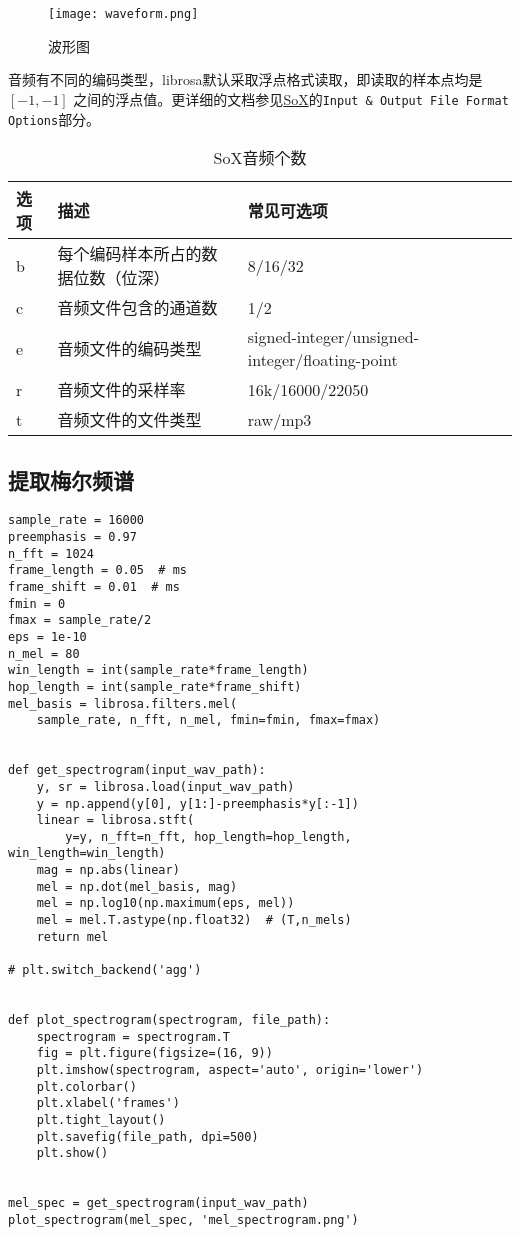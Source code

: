 \documentclass[cn,10pt,math=newtx,citestyle=gb7714-2015,bibstyle=gb7714-2015]{elegantbook}
\begin{document}
\begin{figure}[htbp]
  \centering
  \texttt{[image: waveform.png]}
  \caption{波形图 \label{fig:waveform}}
\end{figure}


音频有不同的编码类型，librosa默认采取浮点格式读取，即读取的样本点均是 $[-1,-1]$ 之间的浮点值。更详细的文档参见\href{http://sox.sourceforge.net/sox.html}{SoX}的\lstinline{Input & Output File Format Options}部分。

\begin{table}[htbp]
  \centering
  \caption{SoX音频个数}
    \begin{tabular}{llll}
    \toprule
    选项 & 描述 & 常见可选项 \\
    \midrule
    b & 每个编码样本所占的数据位数（位深） & 8/16/32 \\
    c & 音频文件包含的通道数 & 1/2 \\
    e & 音频文件的编码类型 & signed-integer/unsigned-integer/floating-point \\
    r & 音频文件的采样率 & 16k/16000/22050 \\
    t & 音频文件的文件类型 & raw/mp3 \\
    \bottomrule
    \end{tabular}%
\end{table}%

\subsection{提取梅尔频谱}

\begin{lstlisting}
sample_rate = 16000
preemphasis = 0.97
n_fft = 1024
frame_length = 0.05  # ms
frame_shift = 0.01  # ms
fmin = 0
fmax = sample_rate/2
eps = 1e-10
n_mel = 80
win_length = int(sample_rate*frame_length)
hop_length = int(sample_rate*frame_shift)
mel_basis = librosa.filters.mel(
    sample_rate, n_fft, n_mel, fmin=fmin, fmax=fmax)


def get_spectrogram(input_wav_path):
    y, sr = librosa.load(input_wav_path)
    y = np.append(y[0], y[1:]-preemphasis*y[:-1])
    linear = librosa.stft(
        y=y, n_fft=n_fft, hop_length=hop_length, win_length=win_length)
    mag = np.abs(linear)
    mel = np.dot(mel_basis, mag)
    mel = np.log10(np.maximum(eps, mel))
    mel = mel.T.astype(np.float32)  # (T,n_mels)
    return mel

# plt.switch_backend('agg')


def plot_spectrogram(spectrogram, file_path):
    spectrogram = spectrogram.T
    fig = plt.figure(figsize=(16, 9))
    plt.imshow(spectrogram, aspect='auto', origin='lower')
    plt.colorbar()
    plt.xlabel('frames')
    plt.tight_layout()
    plt.savefig(file_path, dpi=500)
    plt.show()


mel_spec = get_spectrogram(input_wav_path)
plot_spectrogram(mel_spec, 'mel_spectrogram.png')
\end{lstlisting}
\end{document}
